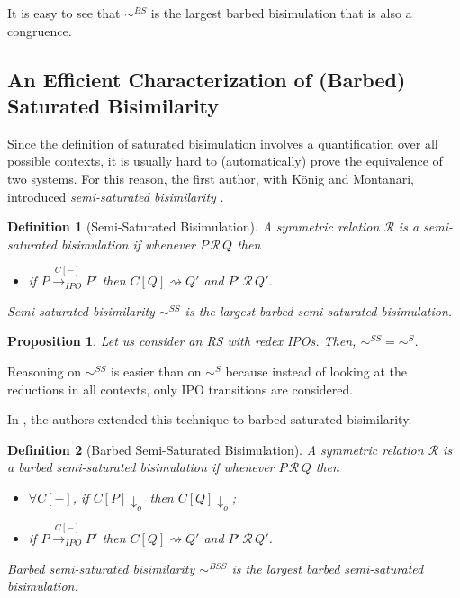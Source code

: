 \documentclass[copyright,creativecommons]{eptcs}
\makeatletter
\def\IPOtr#1{\stackrel{#1}{\rightarrowfill_{IPO}}}
\def \rightarrowfill{\m@th\mathord{\smash-}\mkern-6mu\cleaders\hbox{$\mkern-2mu\mathord{\smash-}\mkern-2mu$}\hfill
  \mkern-6mu\mathord\rightarrow}
\newcommand{\barb}[1]{\downarrow_{#1}}
\newcommand{\bsbis}{\sim^{BS}}
\newcommand{\bssbis}{\sim^{BSS}}
\def\IPOtr#1{\stackrel{#1}{\rightarrow_{IPO}}}
\newcommand{\react}{\rightsquigarrow}
\newcommand{\<}{\langle}
\renewcommand{\>}{\rangle}
\def \rightarrowfill{\m@th\mathord{\smash-}\mkern-6mu\cleaders\hbox{$\mkern-2mu\mathord{\smash-}\mkern-2mu$}\hfill
  \mkern-6mu\mathord\rightarrow}
\newtheorem{definition}{Definition}{}
\newtheorem{proposition}{Proposition}{}
\makeatother
\begin{document}
It is easy to see that $\bsbis$ is the largest barbed bisimulation
that is also a congruence.

\subsection{An Efficient Characterization of (Barbed) Saturated Bisimilarity}

Since the definition of saturated bisimulation involves a
quantification over all possible contexts, it is usually hard to
(automatically) prove the equivalence of two systems. For this
reason, the first author, with K\"onig and Montanari, introduced
\emph{semi-saturated bisimilarity} \cite{LICS2006}.

\begin{definition}[Semi-Saturated Bisimulation]\label{defSSB}
A symmetric relation $\mathcal R$ is a \emph{semi-saturated
  bisimulation} if whenever $P\,\mathcal R\,Q$ then
\begin{itemize}
\item if $P\IPOtr{C[-]} P'$ then $C[Q]\react Q'$ and $P'\,\mathcal R\,Q'$.
\end{itemize}
\emph{Semi-saturated bisimilarity} $\sim^{SS}$ is the largest barbed
semi-saturated bisimulation.
\end{definition}

\begin{proposition}
  \label{theoSemiSatisSat}
Let us consider an RS with redex IPOs. Then,
 $\sim^{SS}=\sim^{S}$.
\end{proposition}
Reasoning on $\sim^{SS}$ is easier than on $\sim^{S}$ because
instead of looking at the reductions in all contexts,
only IPO transitions are considered.




In \cite{BGMFOSSACS09}, the authors extended this technique to barbed
saturated bisimilarity.

\begin{definition}[Barbed Semi-Saturated Bisimulation]\label{def:BSSbis}
  A symmetric relation $\mathcal R$ is a \emph{barbed semi-saturated
  bisimulation} if whenever $P\,\mathcal R\,Q$ then
\begin{itemize}
\item $\forall C[-]$, if $C[P]\barb{o}$ then $C[Q]\barb{o}$;
\item if $P\IPOtr{C[-]} P'$ then $C[Q]\react Q'$ and $P'\,\mathcal R\,Q'$.
\end{itemize}
\emph{Barbed semi-saturated bisimilarity} $\bssbis$ is the largest
barbed semi-saturated bisimulation.
\end{definition}
\end{document}
